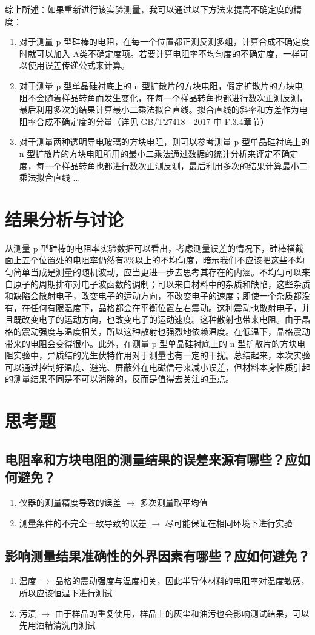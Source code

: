 \documentclass[a4paper,utf8]{article}
\begin{document}
        综上所述：如果重新进行该实验测量，我可以通过以下方法来提高不确定度的精度：
        \begin{enumerate}
            \item 对于测量 p 型硅棒的电阻，在每一个位置都正测反测多组，计算合成不确定度时就可以加入 A类不确定度项。若要计算电阻率不均匀度的不确定度，一样可以使用误差传递公式来计算。
            \item 对于测量 p 型单晶硅衬底上的 n 型扩散片的方块电阻，假定扩散片的方块电阻不会随着样品转角而发生变化，在每一个样品转角也都进行数次正测反测，最后利用多次的结果计算最小二乘法拟合直线。拟合直线的斜率和方差作为电阻率合成不确定度的分量（详见 GB/T27418—2017 中 F.3.4章节）
            \item 对于测量两种透明导电玻璃的方块电阻，则可以参考测量 p 型单晶硅衬底上的 n 型扩散片的方块电阻所用的最小二乘法通过数据的统计分析来评定不确定度，每一个样品转角也都进行数次正测反测，最后利用多次的结果计算最小二乘法拟合直线 $\dotsc$
        \end{enumerate}
\section{结果分析与讨论}
    从测量 p 型硅棒的电阻率实验数据可以看出，考虑测量误差的情况下，硅棒横截面上五个位置处的电阻率仍然有3\%以上的不均匀度，暗示我们不应该把这些不均匀简单当成是测量的随机波动，应当更进一步去思考其存在的内涵。不均匀可以来自原子的周期排布对电子波函数的调制；可以来自材料中的杂质和缺陷，这些杂质和缺陷会散射电子，改变电子的运动方向，不改变电子的速度；即使一个杂质都没有，在任何有限温度下，晶格都会在平衡位置左右震动。这种震动也散射电子，并且既改变电子的运动方向，也改变电子的运动速度。这种散射也带来电阻。由于晶格的震动强度与温度相关，所以这种散射也强烈地依赖温度。在低温下，晶格震动带来的电阻会变得很小。此外，在测量 p 型单晶硅衬底上的 n 型扩散片的方块电阻实验中，异质结的光生伏特作用对于测量也有一定的干扰。总结起来，本次实验可以通过控制好温度、避光、屏蔽外在电磁信号来减小误差，但材料本身性质引起的测量结果不同是不可以消除的，反而是值得去关注的重点。
\section{思考题} 
    \subsection{电阻率和方块电阻的测量结果的误差来源有哪些？应如何避免？}
        \begin{enumerate}
            \item 仪器的测量精度导致的误差 $\rightarrow $ 多次测量取平均值
            \item 测量条件的不完全一致导致的误差 $\rightarrow $ 尽可能保证在相同环境下进行实验
        \end{enumerate}
    \subsection{影响测量结果准确性的外界因素有哪些？应如何避免？}
        \begin{enumerate}
            \item 温度 $\rightarrow $ 晶格的震动强度与温度相关，因此半导体材料的电阻率对温度敏感，所以应该恒温下进行测试
            \item 污渍 $\rightarrow $ 由于样品的重复使用，样品上的灰尘和油污也会影响测试结果，可以先用酒精清洗再测试
        \end{enumerate}
\end{document}
